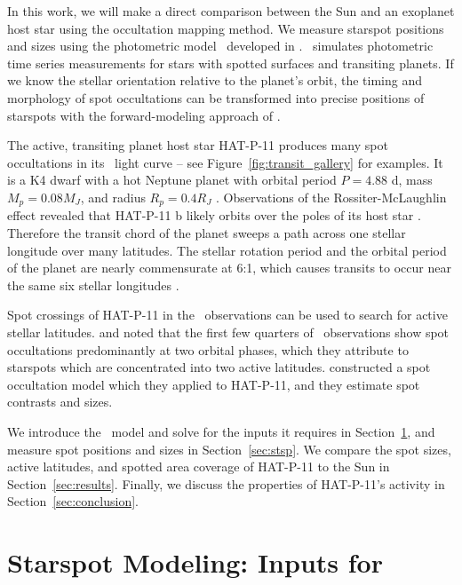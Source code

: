 In this work, we will make a direct comparison between the Sun and an exoplanet host star using the occultation mapping method. We measure starspot positions and sizes using the photometric model \stsp\ developed in \citet{Hebb2017}. \stsp\ simulates photometric time series measurements for stars with spotted surfaces and transiting planets. If we know the stellar orientation relative to the planet's orbit, the timing and morphology of spot occultations can be transformed into precise positions of starspots with the forward-modeling approach of \stsp.

The active, transiting planet host star HAT-P-11 produces many spot occultations in its \kepler\ light curve -- see Figure~\ref{fig:transit_gallery} for examples. It is a K4 dwarf with a hot Neptune planet with orbital period $P = 4.88$ d, mass $M_p = 0.08 M_J$, and radius $R_p = 0.4 R_J$ \citep{bakos2010}. Observations of the Rossiter-McLaughlin effect revealed that HAT-P-11 b likely orbits over the poles of its host star \citep{Winn2010, Hirano2011, Sanchis-Ojeda2011}. Therefore the transit chord of the planet sweeps a path across one stellar longitude over many latitudes. The stellar rotation period and the orbital period of the planet are nearly commensurate at 6:1, which causes transits to occur near the same six stellar longitudes \citep{Beky2014a}.

Spot crossings of HAT-P-11 in the \kepler\ observations can be used to search for active stellar latitudes. \citet{Sanchis-Ojeda2011} and \citet{Deming2011} noted that the first few quarters of \kepler\ observations show spot occultations predominantly at two orbital phases, which they attribute to starspots which are concentrated into two active latitudes. \cite{Beky2014b} constructed a spot occultation model which they applied to HAT-P-11, and they estimate spot contrasts and sizes.

We introduce the \stsp\ model and solve for the inputs it requires in Section~\ref{sec:inputs}, and measure spot positions and sizes in Section~\ref{sec:stsp}. We compare the spot sizes, active latitudes, and spotted area coverage of HAT-P-11 to the Sun in Section~\ref{sec:results}. Finally, we discuss the properties of HAT-P-11's activity in Section~\ref{sec:conclusion}. 

\section{Starspot Modeling: Inputs for \stsp} \label{sec:inputs}

